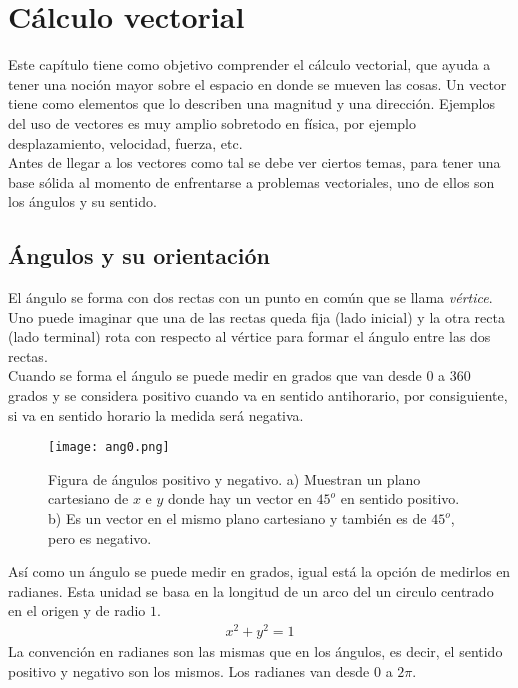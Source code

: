\chapter{Cálculo vectorial}
\label{CV}

Este capítulo tiene como objetivo comprender el cálculo vectorial, que ayuda a tener una noción mayor sobre el espacio en donde se mueven las cosas. Un vector tiene como elementos que lo describen una magnitud y una dirección. Ejemplos del uso de vectores es muy amplio sobretodo en física, por ejemplo desplazamiento, velocidad, fuerza, etc.\\

Antes de llegar a los vectores como tal se debe ver ciertos temas, para tener una base sólida al momento de enfrentarse a problemas vectoriales, uno de ellos son los ángulos y su sentido.   
\section{Ángulos y su orientación}
\label{CV0}
El ángulo se forma con dos rectas con un punto en común que se llama \textit{vértice}. Uno puede imaginar que una de las rectas queda fija (lado inicial) y la otra recta (lado terminal) rota con respecto al vértice para formar el ángulo entre las dos rectas.\\
Cuando se forma el ángulo se puede medir en grados que van desde $0$ a $360$ grados y se considera positivo cuando va en sentido antihorario, por consiguiente, si va en sentido horario la medida será negativa.

 \begin{center}
\begin{figure}[h!]
\centering
\texttt{[image: ang0.png]}
\caption[Figura de ángulos positivo y negativo]{Figura de ángulos positivo y negativo. a) Muestran un plano cartesiano de $x$ e $y$ donde hay un vector en $45^{o}$ en sentido positivo. b) Es un vector en el mismo plano cartesiano y también es de $45^{o}$, pero es negativo.} \label{grados0}
\end{figure}
\end{center}
Así como un ángulo se puede medir en grados, igual está la opción de medirlos en radianes. Esta unidad se basa en la longitud de un arco del un circulo centrado en el origen y de radio $1$.
\begin{eqnarray}
x^{2}+y^{2}=1
\end{eqnarray}
La convención en radianes son las mismas que en los ángulos, es decir, el sentido positivo y negativo son los mismos. Los radianes van desde $0$ a $2\pi$.

